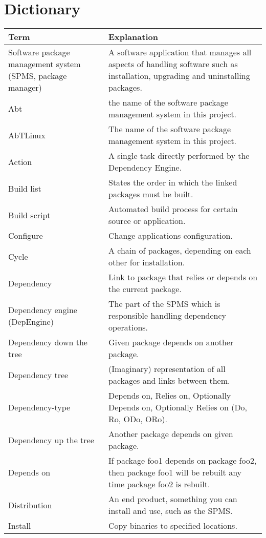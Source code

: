 \section{Dictionary}

\begin{tabular}[t]{|p{4.5cm}|p{8.5cm}|}
\hline
\textbf{Term} & \textbf{Explanation} \\
\hline
Software package management system (SPMS, package manager) & A software application that manages all aspects of handling software such as installation, upgrading and uninstalling packages.\\
\hline
Abt & the name of the software package management system in this project.\\
\hline
AbTLinux & The name of the software package management system in this project.\\
\hline
Action & A single task directly performed by the Dependency Engine.\\
\hline
Build list & States the order in which the linked packages must be built.\\
\hline
Build script & Automated build process for certain source or application.\\
\hline
Configure & Change applications configuration.\\
\hline
Cycle & A chain of packages, depending on each other for installation.\\
\hline
Dependency & Link to package that relies or depends on the current package.\\
\hline
Dependency engine (DepEngine) & The part of the SPMS which is responsible handling dependency operations.\\
\hline
Dependency down the tree & Given package depends on another package.\\
\hline
Dependency tree & (Imaginary) representation of all packages and links between them.\\
\hline
Dependency-type & Depends on, Relies on, Optionally Depends on, Optionally Relies on (Do, Ro, ODo, ORo).\\
\hline
Dependency up the tree & Another package depends on given package.\\
\hline
Depends on & If package foo1 depends on package foo2, then package foo1 will be rebuilt any time package foo2 is rebuilt.\\
\hline
Distribution & An end product, something you can install and use, such as the SPMS.\\
\hline
Install & Copy binaries to specified locations.\\

\end{tabular}
